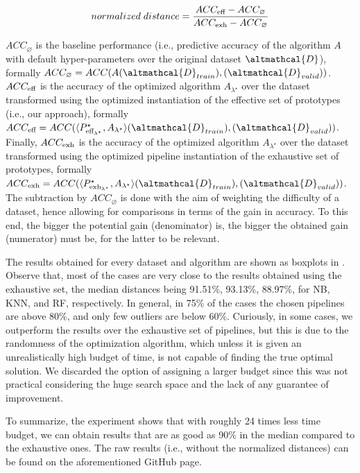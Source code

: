 \begin{equation*}
    normalized\;distance = \frac{ACC_{\textup{eff}} - ACC_{\varnothing}}{ACC_{\textup{exh}} - ACC_{\varnothing}}
\end{equation*}

$ACC_{\varnothing}$ is the baseline performance (i.e., predictive accuracy of the algorithm $A$ with default hyper-parameters over the original dataset $\altmathcal{D}$), formally $ACC_{\varnothing} = ACC(A(\altmathcal{D}_{train}), (\altmathcal{D}_{valid}))$.
$ACC_{\textup{eff}}$ is the accuracy of the optimized algorithm $A_{{\lambda}^{\star}}$ over the dataset transformed using the optimized instantiation of the effective set of prototypes (i.e., our approach), formally $ACC_{\textup{eff}} = ACC(\langle P^{\star}_{\textup{eff}_{{\lambda}^{\star}}}, A_{\lambda^\star} \rangle (\altmathcal{D}_{train}), (\altmathcal{D}_{valid}))$.
Finally, $ACC_{\textup{exh}}$ is the accuracy of the optimized algorithm $A_{{\lambda}^{\star}}$ over the dataset transformed using the optimized pipeline instantiation of the exhaustive set of prototypes, formally $ACC_{\textup{exh}} = ACC(\langle P^{\star}_{\textup{exh}_{{\lambda}^{\star}}}, A_{\lambda^\star} \rangle (\altmathcal{D}_{train}), (\altmathcal{D}_{valid}))$.
The subtraction by $ACC_{\varnothing}$ is done with the aim of weighting the difficulty of a dataset, hence allowing for comparisons in terms of the gain in accuracy.
To this end, the bigger the potential gain (denominator) is, the bigger the obtained gain (numerator) must be, for the latter to be relevant.

The results obtained for every dataset and algorithm are shown as boxplots in .
Observe that, most of the cases are very close to the results obtained using the exhaustive set, the median distances being 91.51\%, 93.13\%, 88.97\%, for NB, KNN, and RF, respectively.
In general, in 75\% of the cases the chosen pipelines are above 80\%, and only few outliers are below 60\%.
Curiously, in some cases, we outperform the results over the exhaustive set of pipelines, but this is due to the randomness of the optimization algorithm, which unless it is given an unrealistically high budget of time, is not capable of finding the true optimal solution.
We discarded the option of assigning a larger budget since this was not practical considering the huge search space and the lack of any guarantee of improvement.

To summarize, the experiment shows that with roughly 24 times less time budget, we can obtain results that are as good as 90\% in the median compared to the exhaustive ones.
The raw results (i.e., without the normalized distances) can be found on the aforementioned GitHub page.


